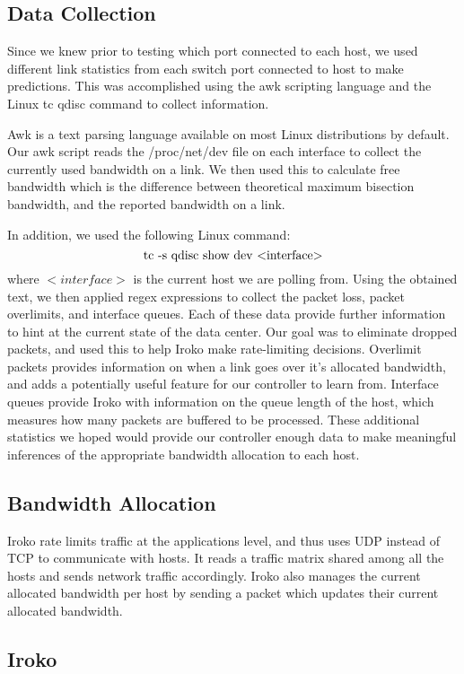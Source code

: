 \subsection{Data Collection }
Since we knew prior to testing which port connected to each host, we used different link statistics from each switch port connected to host to make predictions. This was accomplished using the awk scripting language and the Linux tc qdisc command to collect information.

Awk is a text parsing language available on most Linux distributions by default. Our awk script reads the /proc/net/dev file on each interface to collect the currently used  bandwidth on a link. We then used this to calculate free bandwidth which is the difference between theoretical maximum bisection bandwidth, and the reported bandwidth on a link.

In addition, we used the following Linux command:
\[$tc -s qdisc show dev <interface>$ \] 
where $<interface>$ is the current host we are polling from. Using the obtained text, we then applied regex expressions to collect the packet loss, packet overlimits, and interface queues. Each of these data provide further information to hint at the current state of the data center. Our goal was to eliminate dropped packets, and used this to help Iroko make rate-limiting decisions. Overlimit packets provides information on when a link goes over it’s allocated bandwidth, and adds a potentially useful feature for our controller to learn from. Interface queues provide Iroko with information on the queue length of the host, which measures how many packets are buffered to be processed.  These additional statistics we hoped would provide our controller enough data to make meaningful inferences of the appropriate bandwidth allocation to each host. 

\subsection{Bandwidth Allocation}
Iroko rate limits traffic at the applications level, and thus uses UDP instead of TCP to communicate with hosts. It reads a traffic matrix shared among all the hosts and sends network traffic accordingly. Iroko also manages the current allocated bandwidth per host by sending a packet which updates their current allocated bandwidth.


\subsection{Iroko}

